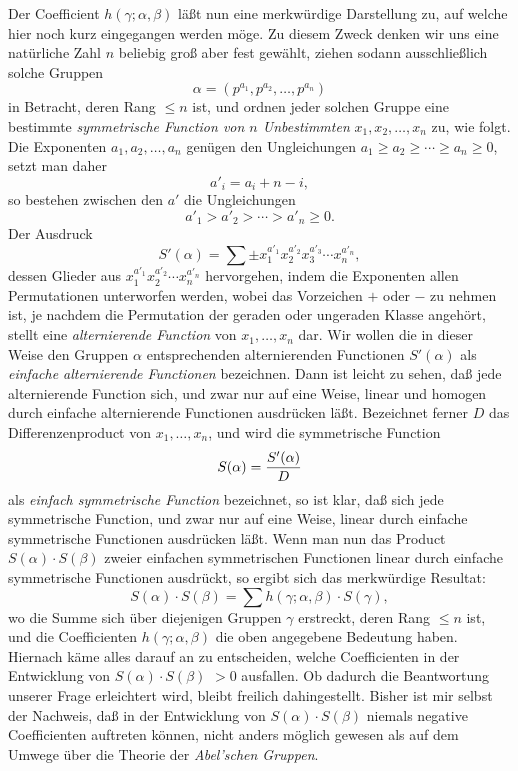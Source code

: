 \documentclass[11pt,a4paper]{article}
\begin{document}
Der Coefficient $h(\gamma;\alpha,\beta)$ läßt nun eine merkwürdige Darstellung zu, auf welche hier noch kurz eingegangen werden möge. Zu diesem Zweck denken wir uns eine natürliche Zahl $n$ beliebig groß aber fest gewählt, ziehen sodann ausschließlich solche Gruppen
\[
 \alpha=(p^{a_1},p^{a_2},\ldots,p^{a_n})
\]
in Betracht, deren Rang $\leq n$ ist, und ordnen jeder solchen Gruppe eine bestimmte \emph{symmetrische Function von $n$ Unbestimmten} $x_1,x_2,\ldots,x_n$ zu, wie folgt. Die Exponenten $a_1,a_2,\ldots,a_n$ genügen den Ungleichungen $a_1\geq a_2\geq\cdots\geq a_n\geq0$, setzt man daher
\[
 a'_i=a_i+n-i,
\]
so bestehen zwischen den $a'$ die Ungleichungen
\[
 a'_1>a'_2>\cdots>a'_n\geq0.
\]
Der Ausdruck
\[
 S'(\alpha)=\sum \pm x_1^{a'_1}x_2^{a'_2}x_3^{a'_3}\cdots x_n^{a'_n},
\]
dessen Glieder aus $x_1^{a'_1}x_2^{a'_2}\cdots x_n^{a'_n}$ hervorgehen, indem die Exponenten allen Permutationen unterworfen werden, wobei das Vorzeichen $+$ oder $-$ zu nehmen ist, je nachdem die Permutation der geraden oder ungeraden Klasse angehört, stellt eine \emph{alternierende Function} von $x_1,
\ldots,x_n$ dar. Wir wollen die in dieser Weise den Gruppen $\alpha$ entsprechenden alternierenden Functionen $S'(\alpha)$ als \emph{einfache alternierende Functionen} bezeichnen. Dann ist leicht zu sehen, daß jede alternierende Function sich, und zwar nur auf eine Weise, linear und homogen durch einfache alternierende Functionen ausdrücken läßt. Bezeichnet ferner $D$ das Differenzenproduct von $x_1,
\ldots,x_n$, und wird die symmetrische Function
\[
 S(\alpha)={S'(\alpha)\over D}
\]
als \emph{einfach symmetrische Function} bezeichnet, so ist klar, daß sich jede symmetrische Function, und zwar nur auf eine Weise, linear durch einfache symmetrische Functionen ausdrücken läßt. Wenn man nun das Product $S(\alpha)\cdot S(\beta)$ zweier einfachen symmetrischen Functionen linear durch einfache symmetrische Functionen ausdrückt, so ergibt sich das merkwürdige Resultat:
\[
 S(\alpha)\cdot S(\beta)=\sum h(\gamma;\alpha,\beta)\cdot S(\gamma),
\]
wo die Summe sich über diejenigen Gruppen $\gamma$ erstreckt, deren Rang $\leq n$ ist, und die Coefficienten $h(\gamma;\alpha,\beta)$ die oben angegebene Bedeutung haben. Hiernach käme alles darauf an zu entscheiden, welche Coefficienten in der Entwicklung von $S(\alpha)\cdot S(\beta)$ $>0$ ausfallen. Ob dadurch die Beantwortung unserer Frage erleichtert wird, bleibt freilich dahingestellt. Bisher ist mir selbst der Nachweis, daß in der Entwicklung von $S(\alpha)\cdot S(\beta)$ niemals negative Coefficienten auftreten können, nicht anders möglich gewesen als auf dem Umwege über die Theorie der \emph{Abel'schen Gruppen}.
\end{document}
